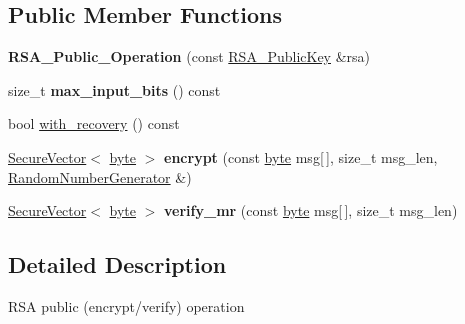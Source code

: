 \subsection*{Public Member Functions}
\begin{DoxyCompactItemize}
\item 
\hypertarget{classBotan_1_1RSA__Public__Operation_a9b57d1b6467959106aa00a4028119c7e}{{\bfseries R\-S\-A\-\_\-\-Public\-\_\-\-Operation} (const \hyperlink{classBotan_1_1RSA__PublicKey}{R\-S\-A\-\_\-\-Public\-Key} \&rsa)}\label{classBotan_1_1RSA__Public__Operation_a9b57d1b6467959106aa00a4028119c7e}

\item 
\hypertarget{classBotan_1_1RSA__Public__Operation_a6ea5bffcf049cf0bc767475e7e30c52f}{size\-\_\-t {\bfseries max\-\_\-input\-\_\-bits} () const }\label{classBotan_1_1RSA__Public__Operation_a6ea5bffcf049cf0bc767475e7e30c52f}

\item 
bool \hyperlink{classBotan_1_1RSA__Public__Operation_abc725ced9a1ddbc5743b5939b12b8b47}{with\-\_\-recovery} () const 
\item 
\hypertarget{classBotan_1_1RSA__Public__Operation_ac16626a19d21f857116671f58d290cf7}{\hyperlink{classBotan_1_1SecureVector}{Secure\-Vector}$<$ \hyperlink{namespaceBotan_a7d793989d801281df48c6b19616b8b84}{byte} $>$ {\bfseries encrypt} (const \hyperlink{namespaceBotan_a7d793989d801281df48c6b19616b8b84}{byte} msg\mbox{[}$\,$\mbox{]}, size\-\_\-t msg\-\_\-len, \hyperlink{classBotan_1_1RandomNumberGenerator}{Random\-Number\-Generator} \&)}\label{classBotan_1_1RSA__Public__Operation_ac16626a19d21f857116671f58d290cf7}

\item 
\hypertarget{classBotan_1_1RSA__Public__Operation_aaffe4fec19ed69c40eb08c693bdb7234}{\hyperlink{classBotan_1_1SecureVector}{Secure\-Vector}$<$ \hyperlink{namespaceBotan_a7d793989d801281df48c6b19616b8b84}{byte} $>$ {\bfseries verify\-\_\-mr} (const \hyperlink{namespaceBotan_a7d793989d801281df48c6b19616b8b84}{byte} msg\mbox{[}$\,$\mbox{]}, size\-\_\-t msg\-\_\-len)}\label{classBotan_1_1RSA__Public__Operation_aaffe4fec19ed69c40eb08c693bdb7234}

\end{DoxyCompactItemize}


\subsection{Detailed Description}
R\-S\-A public (encrypt/verify) operation 

